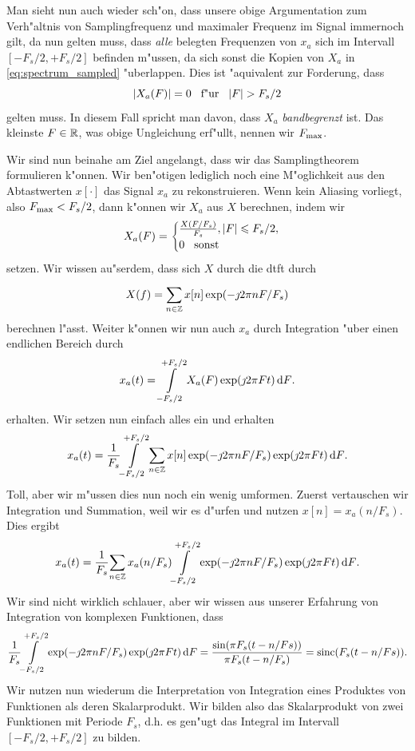 Man sieht nun auch wieder sch"on, dass unsere obige Argumentation zum Verh"altnis von Samplingfrequenz und maximaler Frequenz im Signal immernoch gilt, da nun gelten muss, dass \emph{alle} belegten Frequenzen von $x_a$ sich im Intervall $[-F_s/2,+F_s/2]$ befinden m"ussen, da sich sonst die Kopien von $X_a$ in \eqref{eq:spectrum_sampled} "uberlappen.
Dies ist "aquivalent zur Forderung, dass
\[
{\left| X_a(F) \right|} = 0 {\hspace{3mm} \text{f"ur} \hspace{3mm}} {\left| F \right|} > F_s/2
\]
gelten muss. 
In diesem Fall spricht man davon, dass $X_a$ \emph{bandbegrenzt} ist.
Das kleinste $F \in \mathbb{R}$, was obige Ungleichung erf"ullt, nennen wir $F_{\rm max}$.

Wir sind nun beinahe am Ziel angelangt, dass wir das Samplingtheorem formulieren k"onnen.
Wir ben"otigen lediglich noch eine M"oglichkeit aus den Abtastwerten $x[\cdot]$ das Signal $x_a$ zu rekonstruieren.
Wenn kein Aliasing vorliegt, also $F_{\rm max} < F_s/2$, dann k"onnen wir $X_a$ aus $X$ berechnen, indem wir
\[
X_a(F) = \begin{cases}
    \frac{X(F/{F_s})}{F_s}, {\left| F \right|} \leqslant F_s/2, \\
    0 {\hspace{3mm} \text{sonst} \hspace{3mm}}
\end{cases}
\]
setzen.
Wir wissen au"serdem, dass sich $X$ durch die \gls{dtft} durch
\[
    X(f) = {\sum\limits_{n \in \mathbb{Z}}^{}{
        x[n] \exp(-\jmath 2 \pi n F/F_s)
    }}
\]
berechnen l"asst.
Weiter k"onnen wir nun auch $x_a$ durch Integration "uber einen endlichen Bereich durch
\[
    x_a(t) = {\int\limits_{-F_s/2}^{+F_s/2}{X_a(F) \exp(\jmath 2 \pi F t)}\,\mathrm{d}{F}}.
\]
erhalten. 
Wir setzen nun einfach alles ein und erhalten
\[
x_a(t) = \frac{1}{F_s}{\int\limits_{-F_s/2}^{+F_s/2}{
    {\sum\limits_{n \in \mathbb{Z}}^{}{
        x[n] \exp(-\jmath 2 \pi n F/F_s)
    }} 
    \exp(\jmath 2 \pi F t)}\,\mathrm{d}{F}}.
\]
Toll, aber wir m"ussen dies nun noch ein wenig umformen. Zuerst vertauschen wir Integration und Summation, weil wir es d"urfen und nutzen $x[n] = x_a(n/F_s)$. Dies ergibt
\[
x_a(t) = \frac{1}{F_s}{\sum\limits_{n \in \mathbb{Z}}^{}{
            x_a(n/F_s)
            {\int\limits_{-F_s/2}^{+F_s/2}{
                \exp(-\jmath 2 \pi n F/F_s)
                \exp(\jmath 2 \pi F t)
            }\,\mathrm{d}{F}}
        }}.
\]
Wir sind nicht wirklich schlauer, aber wir wissen aus unserer Erfahrung von Integration von komplexen Funktionen, dass
\[
    \frac{1}{F_s}{\int\limits_{-F_s/2}^{+F_s/2}{
        \exp(-\jmath 2 \pi n F/F_s)
        \exp(\jmath 2 \pi F t)
    }\,\mathrm{d}{F}} = \frac{\sin(\pi F_s (t - n/Fs))}{\pi F_s (t - n/F_s)} = \operatorname*{sinc}(F_s (t - n/Fs)).
\]
Wir nutzen nun wiederum die Interpretation von Integration eines Produktes von Funktionen als deren Skalarprodukt.
Wir bilden also das Skalarprodukt von zwei Funktionen mit Periode $F_s$, d.h. es gen"ugt das Integral im Intervall $[-F_s/2, +F_s/2]$ zu bilden.
